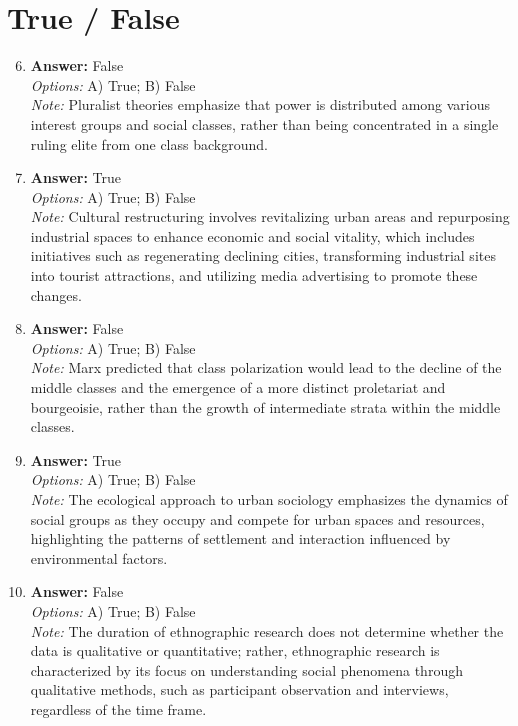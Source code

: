 \documentclass[12pt]{article}
\begin{document}
\section*{True / False}
\begin{enumerate}[label=\arabic*.]
\setcounter{enumi}{5}
\item \textbf{Answer:} False
\\ \textit{Options:} A) True; B) False
\\ \textit{Note:} Pluralist theories emphasize that power is distributed among various interest groups and social classes, rather than being concentrated in a single ruling elite from one class background.
\item \textbf{Answer:} True
\\ \textit{Options:} A) True; B) False
\\ \textit{Note:} Cultural restructuring involves revitalizing urban areas and repurposing industrial spaces to enhance economic and social vitality, which includes initiatives such as regenerating declining cities, transforming industrial sites into tourist attractions, and utilizing media advertising to promote these changes.
\item \textbf{Answer:} False
\\ \textit{Options:} A) True; B) False
\\ \textit{Note:} Marx predicted that class polarization would lead to the decline of the middle classes and the emergence of a more distinct proletariat and bourgeoisie, rather than the growth of intermediate strata within the middle classes.
\item \textbf{Answer:} True
\\ \textit{Options:} A) True; B) False
\\ \textit{Note:} The ecological approach to urban sociology emphasizes the dynamics of social groups as they occupy and compete for urban spaces and resources, highlighting the patterns of settlement and interaction influenced by environmental factors.
\item \textbf{Answer:} False
\\ \textit{Options:} A) True; B) False
\\ \textit{Note:} The duration of ethnographic research does not determine whether the data is qualitative or quantitative; rather, ethnographic research is characterized by its focus on understanding social phenomena through qualitative methods, such as participant observation and interviews, regardless of the time frame.
\end{enumerate}
\end{document}
